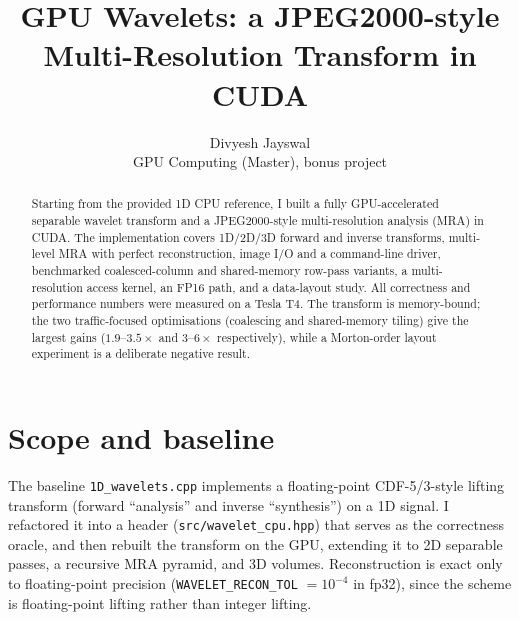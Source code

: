 \documentclass[11pt]{article}
\title{\vspace{-1.5em}\textbf{GPU Wavelets: a JPEG2000-style Multi-Resolution Transform in CUDA}}
\author{Divyesh Jayswal\\\small GPU Computing (Master), bonus project}
\date{}
\newcommand{\code}[1]{\texttt{#1}}
\begin{document}
\maketitle

\begin{abstract}
\noindent
Starting from the provided 1D CPU reference, I built a fully GPU-accelerated
separable wavelet transform and a JPEG2000-style multi-resolution analysis (MRA)
in CUDA. The implementation covers 1D/2D/3D forward and inverse transforms,
multi-level MRA with perfect reconstruction, image I/O and a command-line driver,
benchmarked coalesced-column and shared-memory row-pass variants, a multi-resolution access kernel,
an FP16 path, and a data-layout study. All correctness and performance numbers
were measured on a Tesla T4. The transform is memory-bound; the two traffic-focused
optimisations (coalescing and shared-memory tiling) give the largest gains
($1.9$--$3.5\times$ and $3$--$6\times$ respectively), while a Morton-order layout
experiment is a deliberate negative result.
\end{abstract}

\section{Scope and baseline}
The baseline \code{1D\_wavelets.cpp} implements a floating-point CDF-5/3-style
lifting transform (forward ``analysis'' and inverse ``synthesis'') on a 1D
signal. I refactored it into a header (\code{src/wavelet\_cpu.hpp}) that serves as
the correctness oracle, and then rebuilt the transform on the GPU, extending it to
2D separable passes, a recursive MRA pyramid, and 3D volumes. Reconstruction is
exact only to floating-point precision (\code{WAVELET\_RECON\_TOL} $=10^{-4}$ in
fp32), since the scheme is floating-point lifting rather than integer lifting.
\end{document}
